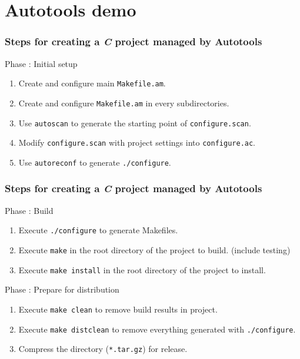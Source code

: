 \section{Autotools demo}


\begin{frame}
    \frametitle{Steps for creating a \textit{C} project managed by Autotools}

    \alert{Phase : Initial setup}

    \begin{enumerate}
        \item Create and configure main \texttt{Makefile.am}.
        \item Create and configure \texttt{Makefile.am} in every subdirectories.
        \item Use \texttt{autoscan} to generate the starting point of \texttt{configure.scan}.
        \item Modify \texttt{configure.scan} with project settings into \texttt{configure.ac}.
        \item Use \texttt{autoreconf} to generate \texttt{./configure}.
    \end{enumerate}
    
\end{frame}

\begin{frame}
    \frametitle{Steps for creating a \textit{C} project managed by Autotools}

    \alert{Phase : Build}

    \begin{enumerate}
        \item Execute \texttt{./configure} to generate Makefiles.
        \item Execute \texttt{make} in the root directory of the project to build. (include testing)
        \item Execute \texttt{make install} in the root directory of the project to install.
    \end{enumerate}

    \alert{Phase : Prepare for distribution}

    \begin{enumerate}
        \item Execute \texttt{make clean} to remove build results in project.
        \item Execute \texttt{make distclean} to remove everything generated with \texttt{./configure}.
        \item Compress the directory (\texttt{*.tar.gz}) for release.
    \end{enumerate}
\end{frame}

